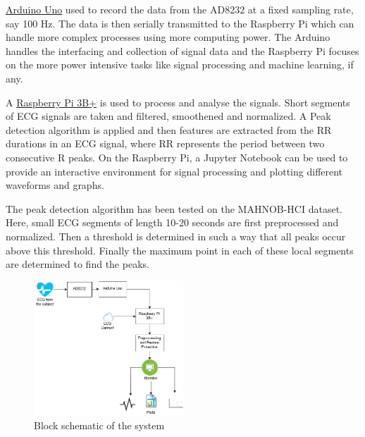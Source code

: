 \documentclass[11pt]{article}
\theoremstyle{definition}
\begin{document}
  \underline{Arduino Uno} used to record the data from the AD8232 at a fixed sampling rate, say 100 Hz. 
 The data is then serially transmitted to the Raspberry Pi which can handle more complex processes using more computing power.   The Arduino handles the interfacing and collection of signal data and the Raspberry Pi focuses on the more power intensive tasks like signal processing and machine learning, if any.

  A \underline{Raspberry Pi 3B+} is used to process and analyse the signals.
  Short segments of ECG signals are taken and filtered, smoothened and normalized.
  A Peak detection algorithm is applied and then features are extracted from the RR durations in an ECG signal, where RR represents the period between two consecutive R peaks.
  On the Raspberry Pi, a Jupyter Notebook can be used to provide an interactive environment for signal processing and plotting different waveforms and graphs.

  The peak detection algorithm has been tested on the MAHNOB-HCI\cite{lichtenauer2011mahnob} dataset. Here, small ECG segments of length 10-20 seconds are first preprocessed and normalized. Then a threshold is determined in such a way that all peaks occur above this threshold. Finally the maximum point in each of these local segments are determined to find the peaks.

  \begin{figure}
    \centering
    \includegraphics[width=0.5\textwidth]{images/block_diagram}
    \caption{Block schematic of the system}
  \end{figure}
\end{document}
